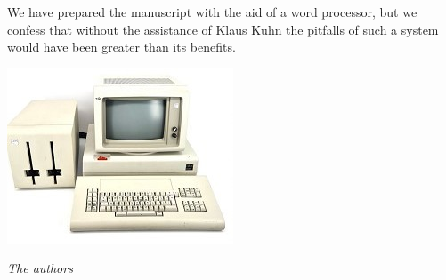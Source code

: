 We have prepared the manuscript with the aid of a word processor, but we confess that without the assistance of Klaus Kuhn the pitfalls of such a system would have been greater than its benefits.

\vspace{.5cm}
\begin{center}
\includegraphics{./part-0/apparaetle.jpg}
\end{center}
\vspace{.5cm}
\begin{flushright}\noindent
${}$\hfill {\it The authors} \\
\end{flushright}


